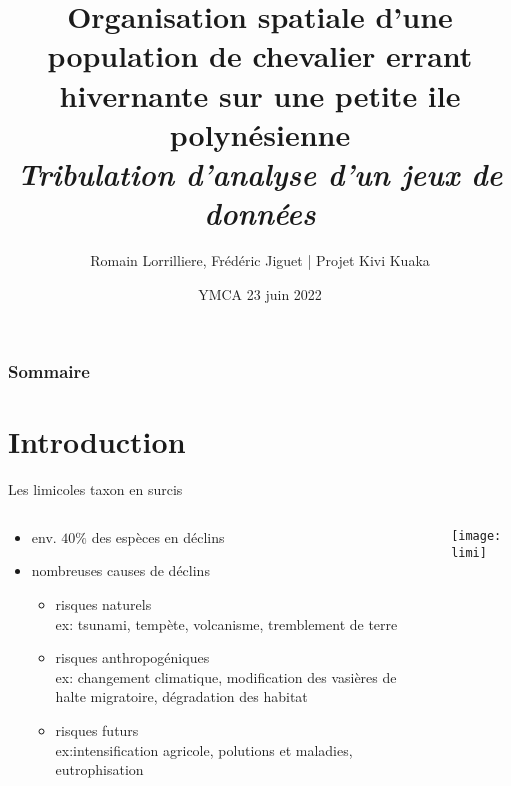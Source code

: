 \documentclass[10pt]{beamer}
\title[Chevaliers errants de Tikei]{Organisation spatiale d'une population de chevalier errant hivernante sur une petite ile polynésienne \\
  \textit{\footnotesize{Tribulation d'analyse d'un jeux de données}}}
\author{Romain Lorrilliere, Frédéric Jiguet | Projet Kivi Kuaka}
\date{YMCA 23 juin 2022}
\begin{document}
\maketitle



\begin{frame}
   \frametitle{Sommaire}
   \tableofcontents[hideallsubsections]
 \end{frame}




\section{Introduction}

\begin{frame}{Les limicoles taxon en surcis}
 \begin{columns}
    \begin{column}[c]{0.55\textwidth}
      \begin{itemize}[<+->]
      \item env. $40 \%$ des espèces en déclins {\tiny \cite{Zoeckler2003,Studds2017}}
      \item nombreuses causes de déclins {\tiny \cite{Sutherland2012}}
        \begin{itemize}
        \item risques naturels \\{\footnotesize ex: tsunami,
          tempète, volcanisme, tremblement de terre}
        \item risques anthropogéniques \\{\footnotesize ex: changement climatique,
          modification des vasières de halte migratoire, dégradation
          des habitat}
        \item risques futurs \\{\footnotesize ex:intensification agricole, polutions et
          maladies, eutrophisation}
        \end{itemize}
      \end{itemize}
    \end{column}
    \begin{column}[c]{0.45\textwidth}
      \begin{center}
       \texttt{[image: limi]}     
      \end{center}
    \end{column}
  \end{columns}
\end{frame}
\end{document}

